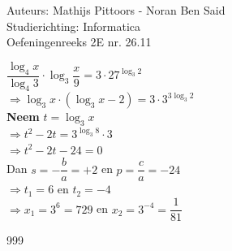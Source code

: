 \documentclass[a4paper]{article}
\begin{document}
  
\noindent \large Auteurs: Mathijs Pittoors - Noran Ben Said\\
\noindent \large Studierichting: Informatica\\
\noindent \large Oefeningenreeks 2E nr. 26.11\\

\medskip

\normalsize

$\dfrac{\log_4 x}{\log_4 3} \cdot \log_3 \dfrac{x}{9} = 3 \cdot 27^{\log_3 2}$ \\

$\Rightarrow \log_3 x \cdot (\log_3 x - 2) = 3 \cdot 3^{3 \log_3 2}$ \\

\textbf{Neem} $t = \log_3 x$ \\

$\Rightarrow t^2 - 2t = 3^{\log_3 8} \cdot 3$ \\

$\Rightarrow t^2 - 2t - 24 = 0$ \\

Dan $s = - \dfrac{b}{a} = +2$ en $p = \dfrac{c}{a} = -24$ \\

$\Rightarrow t_1 = 6$ en $t_2 = -4$ \\

$\Rightarrow x_1 = 3^6 = 729$ en $x_2 = 3^{-4} = \dfrac{1}{81}$



\begin{thebibliography}{999}
\end{thebibliography}
\end{document}
